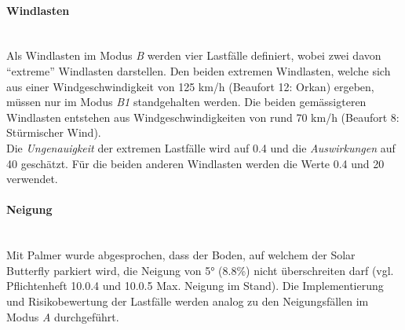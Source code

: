 \paragraph{Windlasten}\mbox{}\\
Als Windlasten im Modus \emph{B} werden vier Lastfälle definiert, wobei zwei davon ``extreme'' Windlasten darstellen. Den beiden extremen Windlasten, welche sich aus einer Windgeschwindigkeit von 125 km/h (Beaufort 12: Orkan) ergeben, müssen nur im Modus \emph{B1} standgehalten werden. Die beiden gemässigteren Windlasten entstehen aus Windgeschwindigkeiten von rund 70 km/h (Beaufort 8: Stürmischer Wind).\\
Die \emph{Ungenauigkeit} der extremen Lastfälle wird auf 0.4 und die \emph{Auswirkungen} auf 40 geschätzt. Für die beiden anderen Windlasten werden die Werte 0.4 und 20 verwendet.
%

\paragraph{Neigung}\mbox{}\\
Mit Palmer wurde abgesprochen, dass der Boden, auf welchem der Solar Butterfly parkiert wird, die Neigung von 5° (8.8\%) nicht überschreiten darf (vgl. Pflichtenheft 10.0.4 und 10.0.5 Max. Neigung im Stand). Die Implementierung und Risikobewertung der Lastfälle werden analog zu den Neigungsfällen im Modus \emph{A} durchgeführt.

